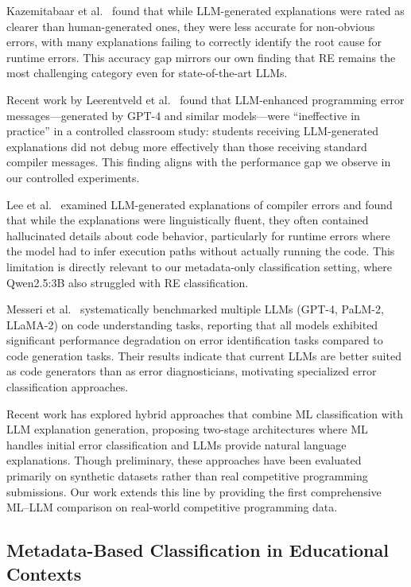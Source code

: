 \documentclass[acmsmall]{acmart}
\begin{document}
Kazemitabaar et al.~\cite{kazemitabaar2024impact} found that while
LLM-generated explanations were rated as clearer than human-generated ones,
they were less accurate for non-obvious errors, with many explanations failing
to correctly identify the root cause for runtime errors. This accuracy gap
mirrors our own finding that RE remains the most challenging category even for
state-of-the-art LLMs.

Recent work by Leerentveld et al.~\cite{leerentveld2024not}
found that LLM-enhanced programming error messages---generated by GPT-4 and
similar models---were ``ineffective in practice'' in a controlled classroom
study: students receiving LLM-generated explanations did not debug more
effectively than those receiving standard compiler messages. This finding
aligns with the performance gap we observe in our controlled experiments.

Lee et al.~\cite{lee2024code}
examined LLM-generated explanations of compiler errors and found that while
the explanations were linguistically fluent, they often contained
hallucinated details about code behavior, particularly for runtime errors
where the model had to infer execution paths without actually running the
code. This limitation is directly relevant to our metadata-only
classification setting, where Qwen2.5:3B also struggled with RE
classification.

Messeri et al.~\cite{prather2024code} systematically benchmarked multiple
LLMs (GPT-4, PaLM-2, LLaMA-2) on code understanding tasks, reporting that
all models exhibited significant performance degradation on error
identification tasks compared to code generation tasks. Their results indicate
that current LLMs are better suited as code generators than as error
diagnosticians, motivating specialized error classification
approaches.

Recent work has explored hybrid approaches that combine ML classification
with LLM explanation generation, proposing two-stage architectures where
ML handles initial error classification and LLMs provide natural language
explanations. Though preliminary, these approaches have been evaluated primarily
on synthetic datasets rather than real competitive programming submissions.
Our work extends this line by providing the first comprehensive ML--LLM
comparison on real-world competitive programming data.

\subsection{Metadata-Based Classification in Educational Contexts}
\end{document}
